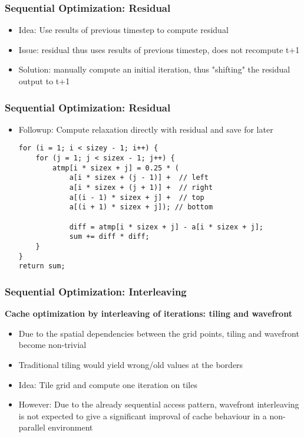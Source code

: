 \begin{frame}[fragile]
\frametitle{Sequential Optimization: Residual}
\begin {itemize}

\item Idea: Use results of previous timestep to compute residual
\item Issue: residual thus uses results of previous timestep, does not recompute t+1
\item Solution: manually compute an initial iteration, thus "shifting" the residual output to t+1
\end {itemize}
\end{frame}

\begin{frame}[fragile]
\frametitle{Sequential Optimization: Residual}
\begin {itemize}

\item Followup: Compute relaxation directly with residual and save for later
\begin{lstlisting}
for (i = 1; i < sizey - 1; i++) {
	for (j = 1; j < sizex - 1; j++) {
		atmp[i * sizex + j] = 0.25 * (
			a[i * sizex + (j - 1)] +  // left
			a[i * sizex + (j + 1)] +  // right
			a[(i - 1) * sizex + j] +  // top
			a[(i + 1) * sizex + j]); // bottom
			
			diff = atmp[i * sizex + j] - a[i * sizex + j];
			sum += diff * diff;
	}
}
return sum;
\end{lstlisting}

\end {itemize}
\end{frame}

\begin{frame}[fragile]
\frametitle{Sequential Optimization: Interleaving}


\textbf{Cache optimization by interleaving of iterations: tiling and wavefront}
\begin {itemize}
\item Due to the spatial dependencies between the grid points, tiling and wavefront become non-trivial
\item Traditional tiling would yield wrong/old values at the borders
\item Idea: Tile grid and compute one iteration on tiles
\item However: Due to the already sequential access pattern, wavefront interleaving is not expected to give a significant improval of cache behaviour in a non-parallel environment

\end {itemize}
\end{frame}

